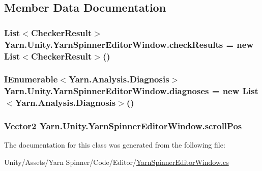 \subsection{Member Data Documentation}
\hypertarget{a00085_aa85ab7bd194e5425b991b9c216d4d10e}{
\subsubsection[{check\-Results}]{\setlength{\rightskip}{0pt plus 5cm}List$<${\bf Checker\-Result}$>$ Yarn.\-Unity.\-Yarn\-Spinner\-Editor\-Window.\-check\-Results = new List$<${\bf Checker\-Result}$>$()\hspace{0.3cm}{\ttfamily [private]}}}\label{a00085_aa85ab7bd194e5425b991b9c216d4d10e}
\hypertarget{a00085_ab4784aaee761b7c60bb142cd410eb774}{
\subsubsection[{diagnoses}]{\setlength{\rightskip}{0pt plus 5cm}I\-Enumerable$<${\bf Yarn.\-Analysis.\-Diagnosis}$>$ Yarn.\-Unity.\-Yarn\-Spinner\-Editor\-Window.\-diagnoses = new List$<${\bf Yarn.\-Analysis.\-Diagnosis}$>$()\hspace{0.3cm}{\ttfamily [private]}}}\label{a00085_ab4784aaee761b7c60bb142cd410eb774}
\hypertarget{a00085_a2d9b9702b0980af9d4202aebd440124b}{
\subsubsection[{scroll\-Pos}]{\setlength{\rightskip}{0pt plus 5cm}Vector2 Yarn.\-Unity.\-Yarn\-Spinner\-Editor\-Window.\-scroll\-Pos\hspace{0.3cm}{\ttfamily [private]}}}\label{a00085_a2d9b9702b0980af9d4202aebd440124b}


The documentation for this class was generated from the following file\-:\begin{DoxyCompactItemize}
\item 
Unity/\-Assets/\-Yarn Spinner/\-Code/\-Editor/\hyperlink{a00106}{Yarn\-Spinner\-Editor\-Window.\-cs}\end{DoxyCompactItemize}
